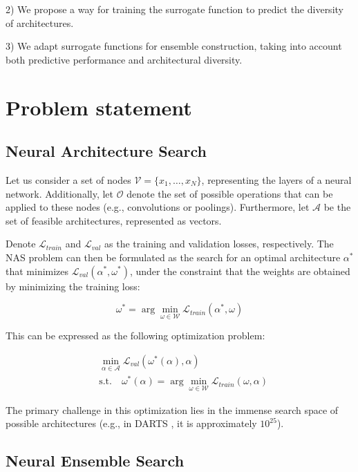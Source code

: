 \documentclass[USenglish]{article}
\theoremstyle{dgthm}
\begin{document}
2) We propose a way for training the surrogate function to predict the diversity of architectures.

3) We adapt surrogate functions for ensemble construction, taking into account both predictive performance and architectural diversity.


\section{Problem statement}

\subsection{Neural Architecture Search}

Let us consider a set of nodes \(\mathcal{V} = \{x_1, \dots, x_N\}\), representing the layers of a neural network. Additionally, let \(\mathcal{O}\) denote the set of possible operations that can be applied to these nodes (e.g., convolutions or poolings). Furthermore, let \(\mathcal{A}\) be the set of feasible architectures, represented as vectors.  

Denote \(\mathcal{L}_{train}\) and \(\mathcal{L}_{val}\) as the training and validation losses, respectively. The NAS problem can then be formulated as the search for an optimal architecture \(\alpha^*\) that minimizes \(\mathcal{L}_{val} (\alpha^*, \omega^*)\), under the constraint that the weights are obtained by minimizing the training loss:  

\[
\omega^* = \arg \min_{\omega \in \mathcal{W}} \mathcal{L}_{train} (\alpha^*, \omega)
\]

This can be expressed as the following optimization problem:  

\begin{equation} 
    \begin{aligned} 
        & \min_{\alpha \in \mathcal{A}} \mathcal{L}_{val} (\omega^*(\alpha), \alpha) \\ 
        & \text{s.t.} \quad \omega^*(\alpha) = \arg \min_{\omega \in \mathcal{W}} \mathcal{L}_{train} (\omega, \alpha) 
    \end{aligned}
\label{eq:nas_problem} 
\end{equation}  

The primary challenge in this optimization lies in the immense search space of possible architectures (e.g., in DARTS \cite{Liu2018}, it is approximately \(10^{25}\)).

\subsection{Neural Ensemble Search}
\end{document}

